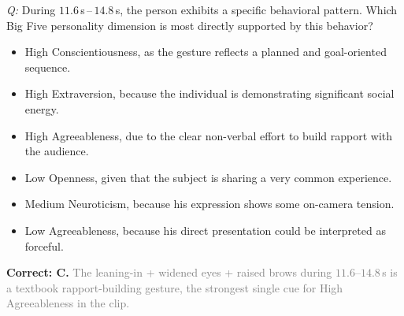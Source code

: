 \documentclass{article}
\begin{document}
\begin{examplebox}[title={(1) Personality Attribution}]
\emph{Q:} During $11.6$\,s\,--\,$14.8$\,s, the person exhibits a specific behavioral pattern. Which Big Five personality dimension is most directly supported by this behavior?
\begin{itemize}[leftmargin=1.4em, itemsep=0pt, topsep=1pt, parsep=0pt]
\item[A.] High Conscientiousness, as the gesture reflects a planned and goal-oriented sequence.
\item[B.] High Extraversion, because the individual is demonstrating significant social energy.
\item[C.] High Agreeableness, due to the clear non-verbal effort to build rapport with the audience.
\item[D.] Low Openness, given that the subject is sharing a very common experience.
\item[E.] Medium Neuroticism, because his expression shows some on-camera tension.
\item[F.] Low Agreeableness, because his direct presentation could be interpreted as forceful.
\end{itemize}
\textcolor{humanc}{\textbf{Correct: C.}} \textcolor{gray}{ The leaning-in + widened eyes + raised brows during $11.6$--$14.8$\,s is a textbook rapport-building gesture, the strongest single cue for High Agreeableness in the clip.}
\end{examplebox}
\end{document}
